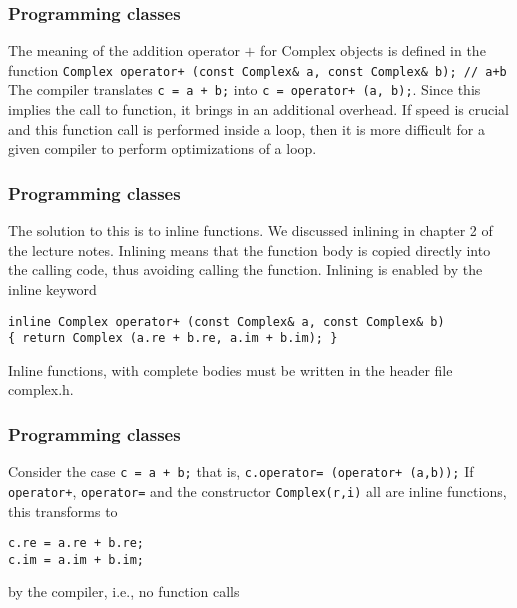 \documentclass{beamer}
\begin{document}
\begin{frame}
\frametitle{Programming classes}

The meaning of the addition operator $+$ for Complex objects is defined in the
function
\Verb!Complex operator+ (const Complex& a, const Complex& b); // a+b!
The compiler translates \Verb!c = a + b;! into \Verb!c = operator+ (a, b);!.
Since this implies the call to function, it brings in an additional overhead. If speed
is crucial and this function call is performed inside a loop, then it is more difficult for a
given compiler to perform optimizations of a loop.
\end{frame}

\begin{frame}
\frametitle{Programming classes}

The solution to this is to inline functions.   We discussed inlining in chapter
2 of the lecture notes.
Inlining means that the function body is copied directly into
the calling code, thus avoiding calling the function.
Inlining is enabled by the inline keyword

\begin{verbatim}
inline Complex operator+ (const Complex& a, const Complex& b)
{ return Complex (a.re + b.re, a.im + b.im); }
\end{verbatim}
Inline functions, with complete bodies must be written in the header file  complex.h.
\end{frame}

\begin{frame}
\frametitle{Programming classes}

Consider  the case \Verb!c = a + b;!
that is,  \Verb!c.operator= (operator+ (a,b));!
If \Verb!operator+!, \Verb!operator=! and the constructor \Verb!Complex(r,i)! all
are inline functions, this transforms to

\begin{verbatim}
c.re = a.re + b.re;
c.im = a.im + b.im;
\end{verbatim}
by the compiler, i.e., no function calls
\end{frame}
\end{document}
